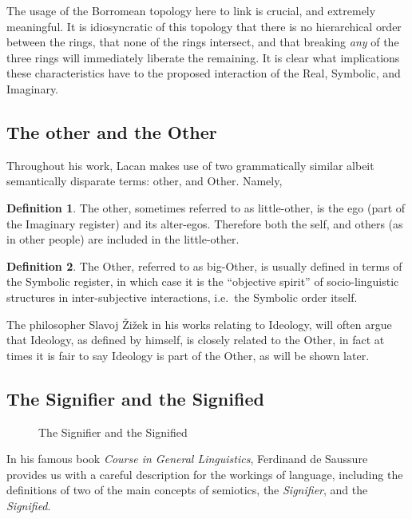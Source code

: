 \documentclass[11pt,letterpaper]{article}
\theoremstyle{definition}
\newtheorem{defn}{Definition}[section]
\begin{document}
The usage of the Borromean topology here to link is crucial, and extremely meaningful. It is idiosyncratic of this topology that there is no hierarchical order between the rings, that none of the rings intersect, and that breaking \emph{any} of the three rings will immediately liberate the remaining. It is clear what implications these characteristics have to the proposed interaction of the Real, Symbolic, and Imaginary.

\subsection{The other and the Other}

Throughout his work, Lacan makes use of two grammatically similar albeit semantically disparate terms: other, and Other. Namely,
\begin{defn}\label{def:little-other}
    The other, sometimes referred to as little-other, is the ego (part of the Imaginary register) and its alter-egos. Therefore both the self, and others (as in other people) are included in the little-other.\autocite{sep-lacan}
\end{defn}
\begin{defn}\label{def:big-other}
    The Other, referred to as big-Other, is usually defined in terms of the Symbolic register, in which case it is the ``objective spirit'' of socio-linguistic structures in inter-subjective interactions, i.e.\ the Symbolic order itself.\autocite{sep-lacan}
\end{defn}

The philosopher Slavoj Žižek in his works relating to Ideology, will often argue that Ideology, as defined by himself, is closely related to the Other, in fact at times it is fair to say Ideology is part of the Other, as will be shown later.
\newpage
\subsection{The Signifier and the Signified}
\begin{figure}
    \centering
    \caption{The Signifier and the Signified}\label{fig:sig}
\end{figure}
In his famous book \textit{Course in General Linguistics}\autocite{saussure_bally_sechehaye_urbain_riedlinger_2016}, Ferdinand de Saussure provides us with a careful description for the workings of language, including the definitions of two of the main concepts of semiotics, the \emph{Signifier}, and the \emph{Signified}.
\end{document}
